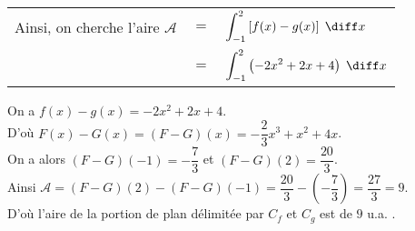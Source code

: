 \vspace*{.3cm}

\begin{tabular}{lll}
\hspace{-.3cm} Ainsi, on cherche l'aire $\mathcal{A}$ & $ = $ & $ \displaystyle{\int_{-1}^2 \left[f(x) - g(x)\right] \; \diff x}$ \vspace*{.3cm} \\
& $=$ & $ \displaystyle{\int_{-1}^2 \left(-2x^2 + 2x + 4\right) \; \diff x}$ \vspace*{.3cm} \\
\end{tabular}

\vspace*{.3cm} 

On a $f(x) - g(x) = -2x^2 + 2x + 4$. \vspace*{.3cm} \\

D'où $F(x) - G(x) = \left(F-G\right)\left(x\right) = -\dfrac{2}{3}x^3 + x^2 + 4x$. \vspace*{.3cm} \\

On a alors $\left(F-G\right)\left(-1\right) = -\dfrac{7}{3}$ et $\left(F-G\right)\left(2\right) = \dfrac{20}{3}$. \vspace*{.3cm} \\

Ainsi $\mathcal{A} = \left(F-G\right)\left(2\right) - \left(F-G\right)\left(-1\right) = \dfrac{20}{3} - \left(-\dfrac{7}{3}\right) = \dfrac{27}{3} = 9$. \vspace*{.3cm} \\

D'où l'aire de la portion de plan délimitée par $C_f$ et $C_g$ est de $9$ u.a. .

\vspace*{-5cm}

\newpage


